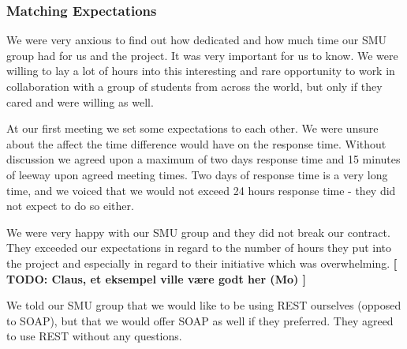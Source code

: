 \subsubsection{Matching Expectations}
We were very anxious to find out how dedicated and how much time our SMU group had for us and the project. It was very important for us to know. We were willing to lay a lot of hours into this interesting and rare opportunity to work in collaboration with a group of students from across the world, but only if they cared and were willing as well.

At our first meeting we set some expectations to each other. We were unsure about the affect the time difference would have on the response time. Without discussion we agreed upon a maximum of two days response time and 15 minutes of leeway upon agreed meeting times. Two days of response time is a very long time, and we voiced that we would not exceed 24 hours response time - they did not expect to do so either.

We were very happy with our SMU group and they did not break our contract. They exceeded our expectations in regard to the number of hours they put into the project and especially in regard to their initiative which was overwhelming. \textbf{[ TODO: Claus, et eksempel ville være godt her (Mo) ]}

We told our SMU group that we would like to be using REST ourselves (opposed to SOAP), but that we would offer SOAP as well if they preferred. They agreed to use REST without any questions.
